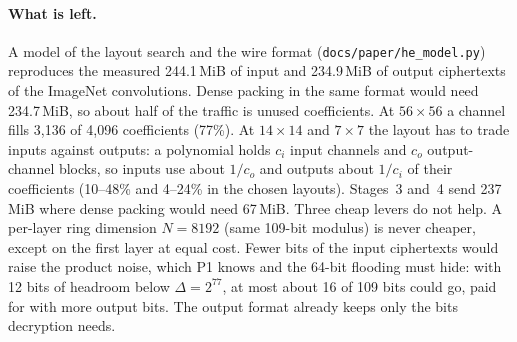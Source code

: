 \paragraph{What is left.} A model of the layout search and the wire format (\texttt{docs/paper/he\_model.py}) reproduces
the measured 244.1\,MiB of input and 234.9\,MiB of output ciphertexts of the ImageNet convolutions. Dense packing in
the same format would need 234.7\,MiB, so about half of the traffic is unused coefficients. At $56\times56$ a channel
fills 3,136 of 4,096 coefficients (77\%). At $14\times14$ and $7\times7$ the layout has to trade inputs against
outputs: a polynomial holds $c_i$ input channels and $c_o$ output-channel blocks, so inputs use about $1/c_o$ and
outputs about $1/c_i$ of their coefficients (10--48\% and 4--24\% in the chosen layouts). Stages~3 and~4 send 237\,MiB
where dense packing would need 67\,MiB. Three cheap levers do not help. A per-layer ring dimension $N = 8192$ (same
109-bit modulus) is never cheaper, except on the first layer at equal cost. Fewer bits of the input ciphertexts would
raise the product noise, which P1 knows and the 64-bit flooding must hide: with 12 bits of headroom below $\Delta =
2^{77}$, at most about 16 of 109 bits could go, paid for with more output bits. The output format already keeps only
the bits decryption needs.

